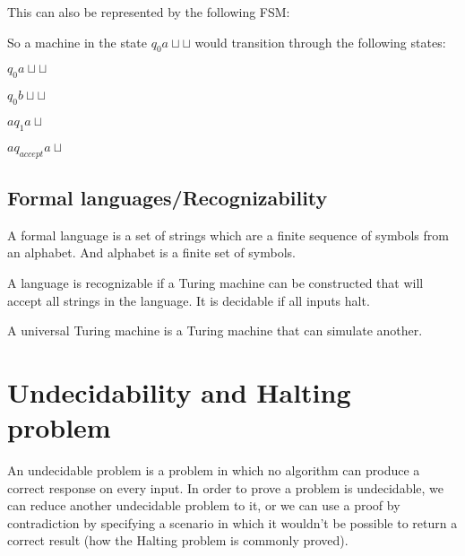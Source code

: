 \documentclass{article}
\begin{document}
This can also be represented by the following FSM:

\begin{multicols}{2}
    


\columnbreak

So a machine in the state $q_0 a \sqcup\sqcup$ would transition through the following states:

$q_0 a \sqcup\sqcup$

$q_0 b \sqcup\sqcup$

$a q_1 a\sqcup$

$a q_{accept} a\sqcup$

\end{multicols}

\subsection{Formal languages/Recognizability}
A formal language is a set of strings which are a finite sequence of symbols from an alphabet. And
alphabet is a finite set of symbols.

A language is recognizable if a Turing machine can be constructed that will accept all strings in
the language. It is decidable if all inputs halt.

A universal Turing machine is a Turing machine that can simulate another.

\section{Undecidability and Halting problem}
An undecidable problem is a problem in which no algorithm can produce a correct response on every
input. In order to prove a problem is undecidable, we can reduce another undecidable problem to it, 
or we can use a proof by contradiction by specifying a scenario in which it wouldn't be possible
to return a correct result (how the Halting problem is commonly proved).
\end{document}
